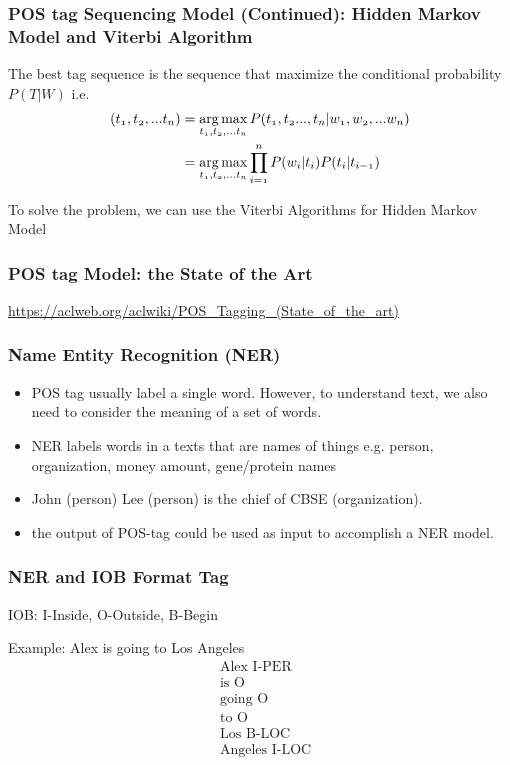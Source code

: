 \documentclass[notheorems, aspectratio=54]{beamer}
\DeclareMathOperator*{\argmax}{arg\,max}
\begin{document}
\begin{frame}
\frametitle {POS tag Sequencing Model (Continued): Hidden Markov Model and Viterbi Algorithm}
The best tag sequence is the sequence that maximize the conditional probability $P(T|W)$ i.e.
\begin{align*}
\mathnormal{(t_1, t_2, ...t_n)} & = \mathnormal{\argmax_{t_1, t_2, ...t_n}P(t_1, t_2..., t_n|w_1, w_2, ...w_n)}\\
&= \mathnormal{\argmax_{t_1, t_2, ...t_n} \prod\limits_{i=1}^n P(w_i |t_i ) P(t_i |t_{i-1})}
\end{align*}

To solve the problem, we can use the Viterbi Algorithms for Hidden Markov Model
\end{frame}

\begin{frame}
\frametitle {POS tag Model: the State of the Art}

\url{https://aclweb.org/aclwiki/POS_Tagging_(State_of_the_art)}
\end{frame}

\begin{frame}
\frametitle{Name Entity Recognition (NER)}
\begin{itemize}
\item POS tag usually label a single word. However, to understand text, we also need to consider the meaning of a set of words.
\item NER labels words in a texts that are names of things e.g. person, organization, money amount, gene/protein names
\item John (person) Lee (person) is the chief of CBSE (organization). 
\item the output of POS-tag could be used as input to accomplish a NER model.
\end{itemize}
\end{frame}

\begin{frame}
\frametitle{NER and IOB Format Tag}
IOB: I-Inside, O-Outside, B-Begin

Example: Alex is going to Los Angeles
\begin{align*}
&\text{Alex I-PER}\\
&\text{is O}\\
&\text{going O}\\
&\text{to O}\\
&\text{Los B-LOC}\\
&\text{Angeles I-LOC}
\end{align*}
\end{frame}
\end{document}
